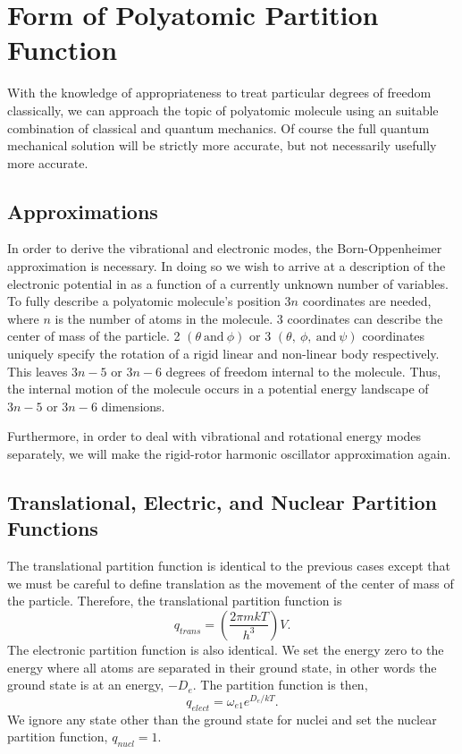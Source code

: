 \section{Form of Polyatomic Partition Function}%
\label{sec:polyppf}
With the knowledge of appropriateness to treat particular degrees of freedom
classically, we can approach the topic of polyatomic molecule using an
suitable combination of classical and quantum mechanics. Of course the full
quantum mechanical solution will be strictly more accurate, but not necessarily
usefully more accurate.
\subsection{Approximations}
In order to derive the vibrational and electronic modes, the Born-Oppenheimer
approximation is necessary. In doing so we wish to arrive at a description of
the electronic potential in as a function of a currently unknown number of
variables. To fully describe a polyatomic molecule's position $3n$ coordinates
are needed, where $n$ is the number of atoms in the molecule. 3 coordinates can
describe the center of mass of the particle. 2 $(\theta~\text{and}~\phi)$ or 3
$(\theta,~\phi,~\text{and}~\psi)$ coordinates uniquely specify the rotation of a
rigid linear and non-linear body respectively. This leaves $3n - 5$ or $3n - 6$
degrees of freedom internal to the molecule. Thus, the internal motion of the
molecule occurs in a potential energy landscape of $3n - 5$ or $3n - 6$
dimensions.

Furthermore, in order to deal with vibrational and rotational energy modes
separately, we will make the rigid-rotor harmonic oscillator approximation
again.

\subsection{Translational, Electric, and Nuclear Partition Functions}
The translational partition function is identical to the previous cases except
that we must be careful to define translation as the movement of the center of
mass of the particle. Therefore, the translational partition function is
\begin{equation}
	q_{trans} = {\left(\frac{2\pi mkT}{h^3}\right)}V.
\end{equation}
The electronic partition function is also identical. We set the energy zero
to the energy where all atoms are separated in their ground state, in
other words the ground state is at an energy, $-D_e$. The partition function is
then,
\begin{equation*}
	q_{elect} = \omega_{e1} e^{D_{e}/kT}.
\end{equation*}
We ignore any state other than the ground state for nuclei and set the nuclear
partition function, $q_{nucl} = 1$.

